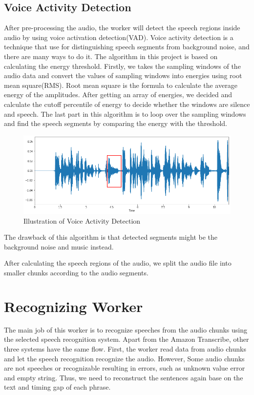 \documentclass[natbib]{muthesis}
\begin{document}
 \subsection{Voice Activity Detection}
 After pre-processing the audio, the worker will detect the speech regions inside audio by using voice activation detection(VAD). Voice activity detection is a technique that use for distinguishing speech segments from background noise, and there are many ways to do it. The algorithm in this project is based on calculating the energy threshold. Firstly, we takes the sampling windows of the audio data and convert the values of sampling windows into energies using root mean square(RMS). Root mean square is the formula to calculate the average energy of the amplitudes. After getting an array of energies, we decided and calculate the cutoff percentile of energy to decide whether the windows are silence and speech. The last part in this algorithm is to loop over the sampling windows and find the speech segments by comparing the energy with the threshold.\cite{VADEnergybase}
 \begin{figure}[H]
 	\centering
 	\captionsetup{justification=centering}
 	\includegraphics[width=0.9\linewidth]{images/vad}
 	\caption{Illustration of Voice Activity Detection}
 	\label{fig:vad}
 \end{figure}
 
 
 The drawback of this algorithm is that detected segments might be the background noise and music instead.
 
 After calculating the speech regions of the audio, we split the audio file into smaller chunks according to the audio segments.
 
 \section{Recognizing Worker}
 The main job of this worker is to recognize speeches from the audio chunks using the selected speech recognition system. Apart from the Amazon Transcribe, other three systems have the same flow. First, the worker read data from audio chunks and let the speech recognition recognize the audio. However, Some audio chunks are not speeches or recognizable resulting in errors, such as unknown value error and empty string. Thus, we need to reconstruct the sentences again base on the text and timing gap of each phrase.
 
\end{document}
